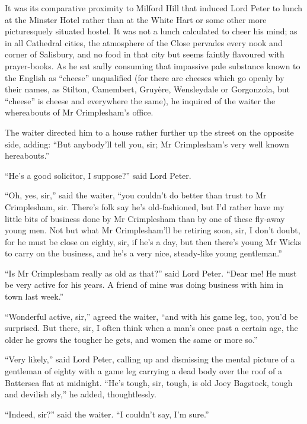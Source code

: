 It was its comparative proximity to Milford Hill that induced Lord Peter to lunch at the Minster Hotel rather than at the White Hart or some other more picturesquely situated hostel. It was not a lunch calculated to cheer his mind; as in all Cathedral cities, the atmosphere of the Close pervades every nook and corner of Salisbury, and no food in that city but seems faintly flavoured with prayer-books. As he sat sadly consuming that impassive pale substance known to the English as \enquote{cheese} unqualified (for there are cheeses which go openly by their names, as Stilton, Camembert, Gruyère, Wensleydale or Gorgonzola, but \enquote{cheese} is cheese and everywhere the same), he inquired of the waiter the whereabouts of Mr Crimplesham’s office.

The waiter directed him to a house rather further up the street on the opposite side, adding: \enquote{But anybody’ll tell you, sir; Mr Crimplesham’s very well known hereabouts.}

\enquote{He’s a good solicitor, I suppose?} said Lord Peter.

\enquote{Oh, yes, sir,} said the waiter, \enquote{you couldn’t do better than trust to Mr Crimplesham, sir. There’s folk say he’s old-fashioned, but I’d rather have my little bits of business done by Mr Crimplesham than by one of these fly-away young men. Not but what Mr Crimplesham’ll be retiring soon, sir, I don’t doubt, for he must be close on eighty, sir, if he’s a day, but then there’s young Mr Wicks to carry on the business, and he’s a very nice, steady-like young gentleman.}

\enquote{Is Mr Crimplesham really as old as that?} said Lord Peter. \enquote{Dear me! He must be very active for his years. A friend of mine was doing business with him in town last week.}

\enquote{Wonderful active, sir,} agreed the waiter, \enquote{and with his game leg, too, you’d be surprised. But there, sir, I often think when a man’s once past a certain age, the older he grows the tougher he gets, and women the same or more so.}

\enquote{Very likely,} said Lord Peter, calling up and dismissing the mental picture of a gentleman of eighty with a game leg carrying a dead body over the roof of a Battersea flat at midnight. \enquote{He’s tough, sir, tough, is old Joey Bagstock, tough and devilish sly,} he added, thoughtlessly.

\enquote{Indeed, sir?} said the waiter. \enquote{I couldn’t say, I’m sure.}

